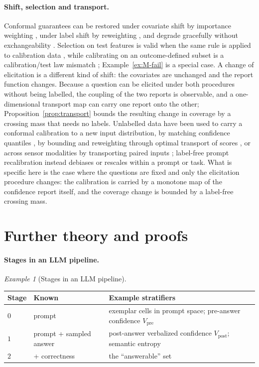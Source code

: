\documentclass[11pt]{article}
\theoremstyle{definition}
\theoremstyle{remark}
\newtheorem{example}[theorem]{Example}
\newcommand{\1}{\mathbf{1}}
\begin{document}
\paragraph{Shift, selection and transport.} Conformal guarantees can be restored under covariate shift
by importance weighting \citep{tibshirani2019conformal}, under label shift by reweighting
\citep{podkopaev2021distribution}, and degrade gracefully without exchangeability
\citep{barber2023beyond}. Selection on test features is valid when the same rule is applied to
calibration data \citep{bao2024selective,jin2024confidence}, while calibrating on an outcome-defined
subset is a calibration/test law mismatch \citep{wang2026trimming}; Example~\ref{ex:M-fail} is a
special case. A change of elicitation is a different kind of shift: the covariates are unchanged and
the report function changes. Because a question can be elicited under both procedures without being
labelled, the coupling of the two reports is observable, and a one-dimensional transport map
\citep{peyre2019computational,santambrogio2015optimal} can carry one report onto the other;
Proposition~\ref{prop:transport} bounds the resulting change in coverage by a crossing mass that needs
no labels. Unlabelled data have been used to carry a conformal calibration to a new input distribution,
by matching confidence quantiles \citep{yilmaz2022testtime}, by bounding and reweighting through
optimal transport of scores \citep{correia2025nonexchangeable}, or across sensor modalities by
transporting paired inputs \citep{doula2026conformal}; label-free prompt recalibration
\citep{zhao2021calibrate,zhou2024batch,shen2024thermometer} instead debiases or rescales within a prompt
or task. What is specific here is the case where the questions are fixed and only the elicitation
procedure changes: the calibration is carried by a monotone map of the confidence report itself, and
the coverage change is bounded by a label-free crossing mass.


\section{Further theory and proofs}
\label{app:theory}
\paragraph{Stages in an LLM pipeline.}
\begin{example}[Stages in an LLM pipeline]
\label{ex:stages}
\begin{center}
\begin{tabular}{lll}
\toprule
Stage & Known & Example stratifiers\\
\midrule
$0$ & prompt & exemplar cells in prompt space; pre-answer confidence $V_{\mathrm{pre}}$\\
$1$ & prompt + sampled answer & post-answer verbalized confidence $V_{\mathrm{post}}$; semantic entropy\\
$2$ & + correctness & the ``answerable'' set\\
\bottomrule
\end{tabular}
\end{center}
\end{example}
\end{document}
